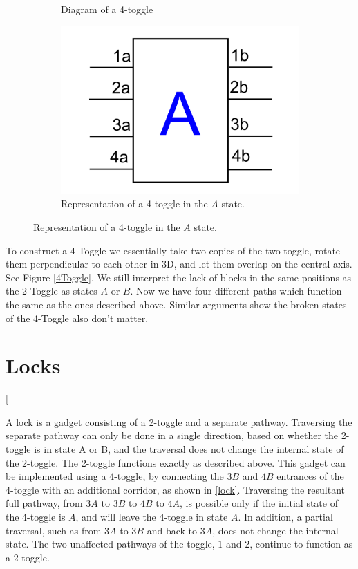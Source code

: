 \documentclass[11pt]{article}
\makeatletter
\gdef\xxx{\@ifnextchar[\xxx@lab\xxx@nolab}
\makeatother
\begin{document}
\begin{figure}[!ht]
  \centering
  \begin{subfigure}[b]{0.45\textwidth}
    \caption{Diagram of a 4-toggle}
    \label{4Toggle3D}
  \end{subfigure}
  \hfill
  \begin{subfigure}[b]{0.45\textwidth}
    \includegraphics[width=\textwidth]{4Toggle}
    \caption{Representation of a 4-toggle in the $A$ state.}
    \label{4ToggleAbstract}
  \end{subfigure}
\end{figure}

To construct a 4-Toggle we essentially take two copies of the two toggle, rotate them perpendicular to each other in 3D, and let them overlap on the central axis. See Figure \ref{4Toggle}. We still interpret the lack of blocks in the same positions as the 2-Toggle as states $A$ or $B$. Now we have four different paths which function the same as the ones described above. Similar arguments show the broken states of the 4-Toggle also don't matter.

\section{Locks}

\xxx{lock figure}

A lock is a gadget consisting of a 2-toggle and a separate pathway. Traversing the separate pathway can only be done in a single direction, based on whether the 2-toggle is in state A or B, and the traversal does not change the internal state of the 2-toggle. The 2-toggle functions exactly
as described above. This gadget can be implemented using a 4-toggle, by
connecting the $3B$ and $4B$ entrances of the 4-toggle with an additional corridor, as shown in \ref{lock}.
Traversing the resultant full pathway, from $3A$ to $3B$ to $4B$ to $4A$, is possible only if the initial
state of the 4-toggle is $A$, and will leave the 4-toggle in state $A$. In addition, a partial traversal,
such as from $3A$ to $3B$ and back to $3A$, does not change the internal state. The two unaffected
pathways of the toggle, $1$ and $2$, continue to function as a 2-toggle.
\end{document}
